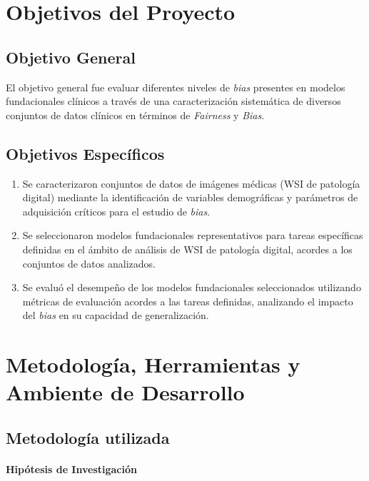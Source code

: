 \section{Objetivos del Proyecto}

\subsection{Objetivo General}

El objetivo general fue evaluar diferentes niveles de \textit{bias} presentes en modelos fundacionales clínicos a través de una caracterización sistemática de diversos conjuntos de datos clínicos en términos de \textit{\gls{Fairness}} y \textit{\gls{Bias}}.

\subsection{Objetivos Específicos}

\begin{enumerate}
\item Se caracterizaron conjuntos de datos de imágenes médicas (WSI de patología digital) mediante la identificación de variables demográficas y parámetros de adquisición críticos para el estudio de \textit{bias}.
\item Se seleccionaron modelos fundacionales representativos para tareas específicas definidas en el ámbito de análisis de WSI de patología digital, acordes a los conjuntos de datos analizados.
\item Se evaluó el desempeño de los modelos fundacionales seleccionados utilizando métricas de evaluación acordes a las tareas definidas, analizando el impacto del \textit{bias} en su capacidad de generalización.
\end{enumerate}

\section{Metodología, Herramientas y Ambiente de Desarrollo}

\subsection{Metodología utilizada}

\paragraph{Hipótesis de Investigación}

